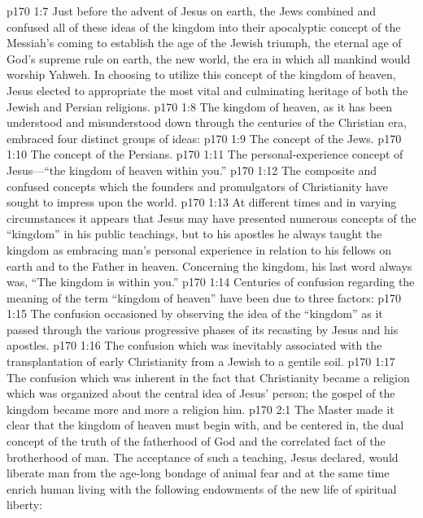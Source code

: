 \pc \vs p170 1:7 Just before the advent of Jesus on earth, the Jews combined and confused all of these ideas of the kingdom into their apocalyptic concept of the Messiah’s coming to establish the age of the Jewish triumph, the eternal age of God’s supreme rule on earth, the new world, the era in which all mankind would worship Yahweh. In choosing to utilize this concept of the kingdom of heaven, Jesus elected to appropriate the most vital and culminating heritage of both the Jewish and Persian religions.
\vs p170 1:8 The kingdom of heaven, as it has been understood and misunderstood down through the centuries of the Christian era, embraced four distinct groups of ideas:
\pc \vs p170 1:9 \bibnobreakspace The concept of the Jews.
\vs p170 1:10 \bibnobreakspace The concept of the Persians.
\vs p170 1:11 \bibnobreakspace The personal\hyp{}experience concept of Jesus---\textcolor{ubdarkred}{“the kingdom of heaven within you.”}
\vs p170 1:12 \bibnobreakspace The composite and confused concepts which the founders and promulgators of Christianity have sought to impress upon the world.
\pc \vs p170 1:13 At different times and in varying circumstances it appears that Jesus may have presented numerous concepts of the “kingdom” in his public teachings, but to his apostles he always taught the kingdom as embracing man’s personal experience in relation to his fellows on earth and to the Father in heaven. Concerning the kingdom, his last word always was, \textcolor{ubdarkred}{“The kingdom is within you.”}
\vs p170 1:14 Centuries of confusion regarding the meaning of the term “kingdom of heaven” have been due to three factors:
\pc \vs p170 1:15 \bibnobreakspace The confusion occasioned by observing the idea of the “kingdom” as it passed through the various progressive phases of its recasting by Jesus and his apostles.
\vs p170 1:16 \bibnobreakspace The confusion which was inevitably associated with the transplantation of early Christianity from a Jewish to a gentile soil.
\vs p170 1:17 \bibnobreakspace The confusion which was inherent in the fact that Christianity became a religion which was organized about the central idea of Jesus’ person; the gospel of the kingdom became more and more a religion  him.
\vs p170 2:1 The Master made it clear that the kingdom of heaven must begin with, and be centered in, the dual concept of the truth of the fatherhood of God and the correlated fact of the brotherhood of man. The acceptance of such a teaching, Jesus declared, would liberate man from the age\hyp{}long bondage of animal fear and at the same time enrich human living with the following endowments of the new life of spiritual liberty:
